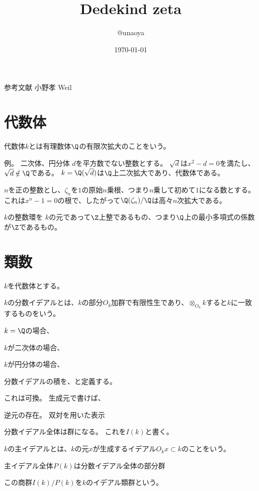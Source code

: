 \documentclass{jsarticle}
\title{Dedekind zeta}
\author{@unaoya}
\date{\today}
\begin{document}
\maketitle
参考文献
小野孝
Weil

\section{代数体}
代数体$k$とは有理数体$\Q$の有限次拡大のことをいう。

例。
二次体、円分体
$d$を平方数でない整数とする。
$\sqrt{d}$は$x^2-d=0$を満たし、$\sqrt{d}\notin\Q$である。
$k=\Q(\sqrt{d})$は$\Q$上二次拡大であり、代数体である。

$n$を正の整数とし、$\zeta_n$を$1$の原始$n$乗根、つまり$n$乗して初めて$1$になる数とする。
これは$x^n-1=0$の根で、したがって$\Q(\zeta_n)/\Q$は高々$n$次拡大である。

$k$の整数環を
$k$の元であって$\Z$上整であるもの、つまり$\Q$上の最小多項式の係数が$\Z$であるもの。

\section{類数}
$k$を代数体とする。

\begin{dfn}
$k$の分数イデアルとは、$k$の部分$O_k$加群で有限性生であり、$\otimes_{O_k}k$すると$k$に一致するものをいう。
\end{dfn}

\begin{eg}
$k=\Q$の場合、

$k$が二次体の場合、

$k$が円分体の場合、
\end{eg}

\begin{dfn}
分数イデアルの積を、と定義する。
\end{dfn}

これは可換。
生成元で書けば、

逆元の存在。
双対を用いた表示

分数イデアル全体は群になる。
これを$I(k)$と書く。

$k$の主イデアルとは、$k$の元$x$が生成するイデアル$O_kx \subset k$のことをいう。

主イデアル全体$P(k)$は分数イデアル全体の部分群

\begin{dfn}
この商群$I(k)/P(k)$を$k$のイデアル類群という。
\end{dfn}
\end{document}
